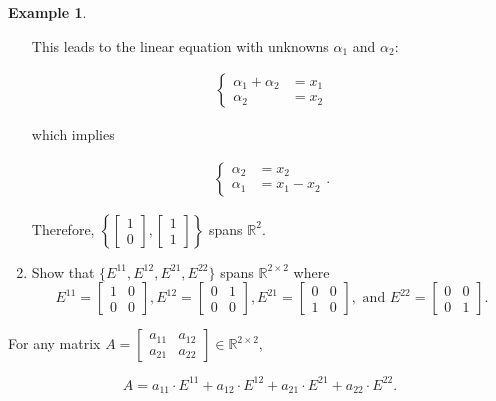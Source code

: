 \documentclass[12pt]{article}
\theoremstyle{definition}
\newtheorem*{example}{Example}
\begin{document}
\begin{example}
\begin{enumerate}[label = (\arabic*)]
This leads to the linear equation with unknowns $\alpha_1$ and $\alpha_2$:


\begin{align*}
\begin{cases}
\alpha_1 + \alpha_2 &= x_1 \\
\alpha_2 &= x_2
\end{cases}
\end{align*}

which implies

\begin{align*}
\begin{cases}
\alpha_2 &= x_2 \\
\alpha_1 &= x_1 - x_2
\end{cases}.
\end{align*}

Therefore, $\left\{ \begin{bmatrix} 1 \\ 0 \end{bmatrix}, \begin{bmatrix} 1 \\ 1 \end{bmatrix} \right\}$
spans $\mathbb{R}^2$.

\item Show that $\{ E^{11}, E^{12}, E^{21}, E^{22} \}$ spans $\mathbb{R}^{2 \times 2}$ where
\[
E^{11} = \begin{bmatrix} 1 & 0 \\ 0 & 0 \end{bmatrix},
E^{12} = \begin{bmatrix} 0 & 1 \\ 0 & 0 \end{bmatrix},
E^{21} = \begin{bmatrix} 0 & 0 \\ 1 & 0 \end{bmatrix},
\text{ and } E^{22} = \begin{bmatrix} 0 & 0 \\ 0 & 1 \end{bmatrix}.
\]
\end{enumerate}

For any matrix $A = \begin{bmatrix} a_{11} & a_{12} \\ a_{21} & a_{22} \end{bmatrix} \in \mathbb{R}^{2 \times 2}$,

\[
A = a_{11} \cdot E^{11} + a_{12} \cdot E^{12} + a_{21} \cdot E^{21} + a_{22} \cdot E^{22}.
\]


\end{example}
\end{document}

